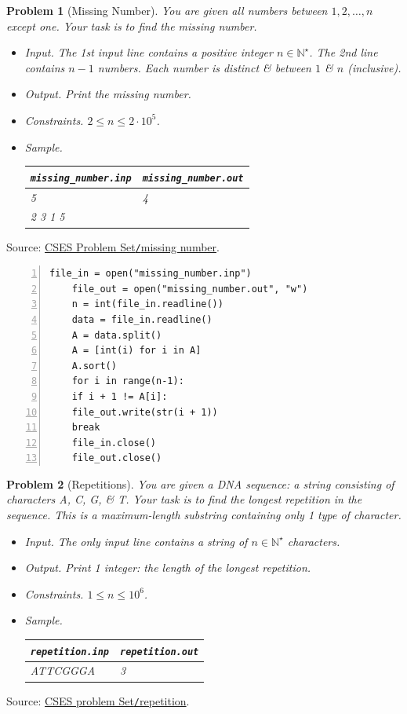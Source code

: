 \documentclass{article}
\newtheorem{problem}{Problem}
\begin{document}
\begin{problem}[Missing Number]
	You are given all numbers between $1,2,\ldots,n$ except one. Your task is to find the missing number.
	\begin{itemize}
		\item {\sf Input.} The 1st input line contains a positive integer $n\in\mathbb{N}^\star$. The 2nd line contains $n - 1$ numbers. Each number is distinct \& between $1$ \& $n$ (inclusive).
		\item {\sf Output.} Print the missing number.
		\item {\sf Constraints.} $2\le n\le2\cdot10^5$.
		\item {\sf Sample.}
		\begin{table}[H]
			\centering
			\begin{tabular}{|l|l|}
				\hline
				\verb|missing_number.inp| & \verb|missing_number.out| \\
				\hline
				5 & 4 \\
				2 3 1 5 & \\
				\hline
			\end{tabular}
		\end{table}
	\end{itemize}
\end{problem}
Source: \href{https://cses.fi/problemset/task/1083}{CSES Problem Set{\tt/}missing number}.

\begin{Verbatim}[numbers=left,xleftmargin=5mm]
	file_in = open("missing_number.inp")
	file_out = open("missing_number.out", "w")
	n = int(file_in.readline())
	data = file_in.readline()
	A = data.split()
	A = [int(i) for i in A]
	A.sort()
	for i in range(n-1):
	if i + 1 != A[i]:
	file_out.write(str(i + 1))
	break
	file_in.close()
	file_out.close()
\end{Verbatim}

\begin{problem}[Repetitions]
	You are given a DNA sequence: a string consisting of characters A, C, G, \& T. Your task is to find the longest repetition in the sequence. This is a maximum-length substring containing only 1 type of character.
	\begin{itemize}
		\item {\sf Input.} The only input line contains a string of $n\in\mathbb{N}^\star$ characters.
		\item {\sf Output.} Print 1 integer: the length of the longest repetition.
		\item {\sf Constraints.} $1\le n\le10^6$.
		\item {\sf Sample.}
		\begin{table}[H]
			\centering
			\begin{tabular}{|l|l|}
				\hline
				\verb|repetition.inp| & \verb|repetition.out| \\
				\hline
				ATTCGGGA & 3 \\
				\hline
			\end{tabular}
		\end{table}
	\end{itemize}	
\end{problem}
Source: \href{https://cses.fi/problemset/task/1069}{CSES problem Set{\tt/}repetition}.
\end{document}
